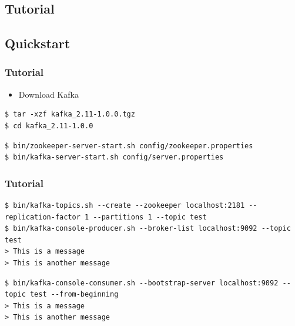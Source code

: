 \lstset{style=bashstyle}
\begin{frame}[fragile]
\section{Tutorial}
\subsection{Quickstart}
\frametitle{Tutorial}
\begin{itemize}
\item Download Kafka~\cite{KafkaDownload}
\end{itemize}
\begin{lstlisting}[]
$ tar -xzf kafka_2.11-1.0.0.tgz
$ cd kafka_2.11-1.0.0
\end{lstlisting}

\begin{lstlisting}[]
$ bin/zookeeper-server-start.sh config/zookeeper.properties
$ bin/kafka-server-start.sh config/server.properties
\end{lstlisting}
\end{frame}

\begin{frame}[fragile]
\frametitle{Tutorial}
\begin{lstlisting}[]
$ bin/kafka-topics.sh --create --zookeeper localhost:2181 --replication-factor 1 --partitions 1 --topic test
$ bin/kafka-console-producer.sh --broker-list localhost:9092 --topic test
> This is a message
> This is another message
\end{lstlisting}

\begin{lstlisting}[]
$ bin/kafka-console-consumer.sh --bootstrap-server localhost:9092 --topic test --from-beginning
> This is a message
> This is another message
\end{lstlisting}
\end{frame}

